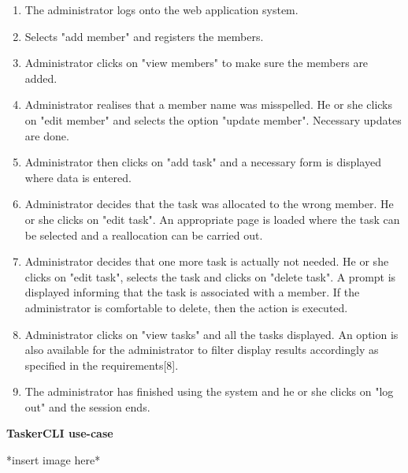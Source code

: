 \documentclass{project}
\begin{document}
\begin{enumerate}
	\item The administrator logs onto the web application system.
	\item Selects "add member" and registers the members.
	\item Administrator clicks on "view members" to make sure the members are added.
	\item Administrator realises that a member name was misspelled. He or she clicks on "edit member" and selects the option "update member".  Necessary updates are done.
	\item Administrator then clicks on "add task" and a necessary form is displayed where data is entered.
	\item Administrator decides that the task was allocated to the wrong member.  He or she clicks on "edit task".  An appropriate page is loaded where the task can be selected and a reallocation can be carried out.
	\item Administrator decides that one more task is actually not needed.  He or she clicks on "edit task", selects the task and clicks on "delete task".  A prompt is displayed informing that the task is associated with a member.  If the administrator is comfortable to delete, then the action is executed.
	\item Administrator clicks on "view tasks" and all the tasks displayed.  An option is also available for the administrator to filter display results accordingly as specified in the requirements[8].
	\item The administrator has finished using the system and he or she clicks on "log out" and the session ends.
\end{enumerate} 
\textbf{TaskerCLI use-case}

*insert image here* 
\end{document}
